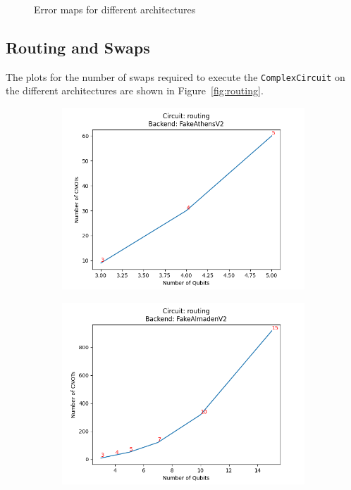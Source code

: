 \documentclass[11pt]{article}
\begin{document}
\begin{figure}[hbtp]
\begin{subfigure}{\linewidth}
    \end{subfigure}
    \caption{Error maps for different architectures}
    \label{fig:routing_errormap}
\end{figure}

\subsection{Routing and Swaps}
The plots for the number of swaps required to execute the \texttt{ComplexCircuit} on the different architectures are shown in Figure~\ref{fig:routing}.
\begin{figure}[hbtp]
    \begin{subfigure}{\linewidth}
        \centering
        \includegraphics[width=0.5\linewidth]{outputs/routing_FakeAthensV2.png}
    \end{subfigure}
    \begin{subfigure}{0.5\linewidth}
        \centering
        \includegraphics[width=\linewidth]{outputs/routing_FakeAlmadenV2.png}
    \end{subfigure}
    \begin{subfigure}{0.5\linewidth}

\end{subfigure}
\end{figure}
\end{document}
